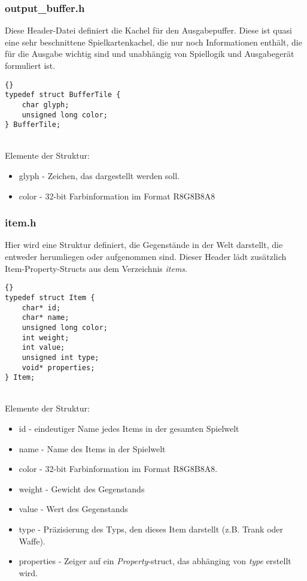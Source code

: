 \documentclass[11pt,a4paper,notitlepage]{report}
\begin{document}
	\newpage
	\subsubsection*{output\_buffer.h}
	Diese Header-Datei definiert die Kachel für den Ausgabepuffer. Diese ist quasi eine sehr beschnittene Spielkartenkachel, die nur noch Informationen enthält, die für die Ausgabe wichtig sind und unabhängig von Spiellogik und Ausgabegerät formuliert ist.
	
		\begin{lstlisting}[caption=BufferTile]{}
typedef struct BufferTile {
	char glyph;
	unsigned long color;
} BufferTile;
		\end{lstlisting} \hspace*{\fill} \\
Elemente der Struktur:
		\begin{itemize}
			\item glyph - Zeichen, das dargestellt werden soll.
			\item color - 32-bit Farbinformation im Format R8G8B8A8
		\end{itemize}
	
	\newpage
	\subsubsection*{item.h}
	Hier wird eine Struktur definiert, die Gegenstände in der Welt darstellt, die entweder herumliegen oder aufgenommen sind. Dieser Header lädt zusätzlich Item-Property-Structs aus dem Verzeichnis \textit{items}.
	
	\begin{lstlisting}[caption=Item]{}
typedef struct Item {
	char* id;
	char* name;
	unsigned long color;
	int weight;
	int value;
	unsigned int type;
	void* properties;
} Item;
		\end{lstlisting} \hspace*{\fill} \\
Elemente der Struktur:
		\begin{itemize}
			\item id - eindeutiger Name jedes Items in der gesamten Spielwelt
			\item name - Name des Items in der Spielwelt
			\item color - 32-bit Farbinformation im Format R8G8B8A8.
			\item weight - Gewicht des Gegenstands
			\item value - Wert des Gegenstands
			\item type - Präzisierung des Typs, den dieses Item darstellt (z.B. Trank oder Waffe).
			\item properties - Zeiger auf ein \textit{Property}-struct, das abhänging von \textit{type} erstellt wird.
		\end{itemize}
		
\end{document}
